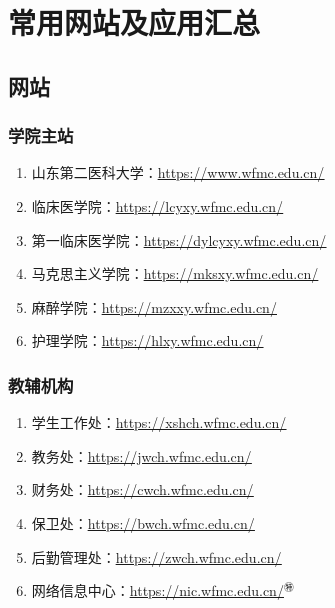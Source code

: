 \chapter[常用网站及应用汇总]{常用网站及应用汇总}
\section[网站]{网站}
\subsection[学院主站]{学院主站}
\begin{enumerate}
    \item 山东第二医科大学：\uline{\href{https://www.wfmc.edu.cn/}{https://www.wfmc.edu.cn/}}
    \item 临床医学院：\uline{\href{https://lcyxy.wfmc.edu.cn/}{https://lcyxy.wfmc.edu.cn/}}
    \item 第一临床医学院：\uline{\href{https://dylcyxy.wfmc.edu.cn/}{https://dylcyxy.wfmc.edu.cn/}}
    \item 马克思主义学院：\uline{\href{https://mksxy.wfmc.edu.cn/}{https://mksxy.wfmc.edu.cn/}}
    \item 麻醉学院：\uline{\href{https://mzxxy.wfmc.edu.cn/}{https://mzxxy.wfmc.edu.cn/}}
    \item 护理学院：\uline{\href{https://hlxy.wfmc.edu.cn/}{https://hlxy.wfmc.edu.cn/}}
\end{enumerate}

\subsection[教辅机构]{教辅机构}
\begin{enumerate}
    \item 学生工作处：\uline{\href{https://xshch.wfmc.edu.cn/}{https://xshch.wfmc.edu.cn/}}
    \item 教务处：\uline{\href{https://jwch.wfmc.edu.cn/}{https://jwch.wfmc.edu.cn/}}
    \item 财务处：\uline{\href{https://cwch.wfmc.edu.cn/}{https://cwch.wfmc.edu.cn/}}
    \item 保卫处：\uline{\href{https://bwch.wfmc.edu.cn/}{https://bwch.wfmc.edu.cn/}}
    \item 后勤管理处：\uline{\href{https://zwch.wfmc.edu.cn/}{https://zwch.wfmc.edu.cn/}}
    \item 网络信息中心：\uline{\href{https://nic.wfmc.edu.cn/}{https://nic.wfmc.edu.cn/}$^㊕$}
\end{enumerate}

